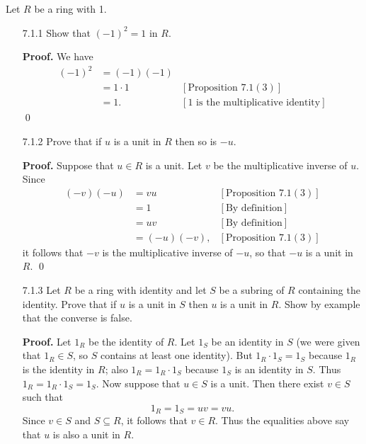 Let $R$ be a ring with 1.
\begin{enumerate}
   \item[7.1.1]   Show that $(-1)^2 = 1$ in $R$.

      \textbf{Proof.} We have
      \begin{align*}
         (-1)^2 &= (-1)(-1) \\
                &= 1 \cdot 1 &[\text{Proposition }7.1 (3)] \\
                &= 1.        &[1 \text{ is the multiplicative identity}]
      \end{align*} \qed
   \item[7.1.2]   Prove that if $u$ is a unit in $R$ then so is $-u$.

      \textbf{Proof.} Suppose that $u \in R$ is a unit. Let $v$ be the 
      multiplicative inverse of $u$. Since
      \begin{align*}
         (-v)(-u) &= vu          &[\text{Proposition }7.1 (3)] \\
                  &= 1           &[\text{By definition}] \\
                  &= uv          &[\text{By definition}] \\
                  &= (-u)(-v),   &[\text{Proposition }7.1 (3)]
      \end{align*}
      it follows that $-v$ is the multiplicative inverse of $-u$, so that $-u$
      is a unit in $R$. \qed
   \item[7.1.3]   Let $R$ be a ring with identity and let $S$ be a subring of
                  $R$ containing the identity. Prove that if $u$ is a unit in
                  $S$ then $u$ is a unit in $R$. Show by example that the
                  converse is false.

      \textbf{Proof.} Let $1_R$ be the identity of $R$. Let $1_S$ be an identity
      in $S$ (we were given that $1_R \in S$, so $S$ contains at least one
      identity). But $1_R \cdot 1_S = 1_S$ because $1_R$ is the identity in
      $R$; also $1_R = 1_R \cdot 1_S$ because $1_S$ is an identity in $S$. Thus
      $1_R = 1_R \cdot 1_S = 1_S$. Now suppose that $u \in S$ is a unit. Then
      there exist $v \in S$ such that
      $$1_R = 1_S = uv = vu.$$
      Since $v \in S$ and $S \subseteq R$, it follows that $v \in R$. Thus the
      equalities above say that $u$ is also a unit in $R$.


\end{enumerate}
